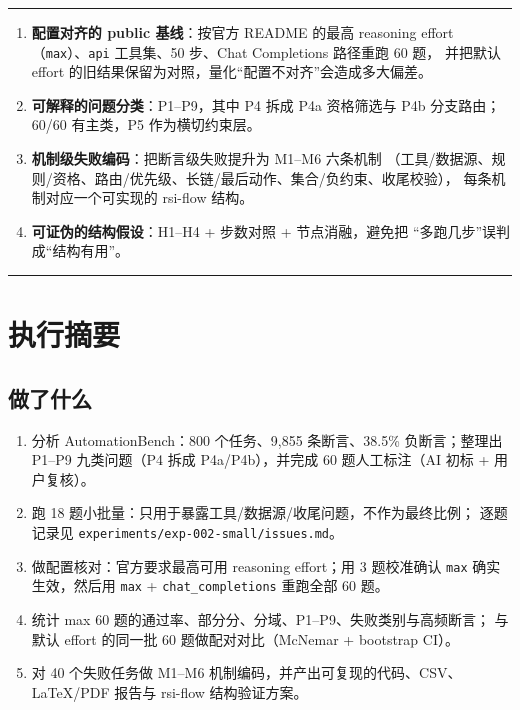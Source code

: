 \documentclass[UTF8,a4paper,11pt]{ctexart}
\begin{document}
\noindent\rule{\textwidth}{0.4pt}
\begin{enumerate}
  \item \textbf{配置对齐的 public 基线}：按官方 README 的最高 reasoning effort
  （\texttt{max}）、\texttt{api} 工具集、50 步、Chat Completions 路径重跑 60 题，
  并把默认 effort 的旧结果保留为对照，量化“配置不对齐”会造成多大偏差。
  \item \textbf{可解释的问题分类}：P1--P9，其中 P4 拆成 P4a 资格筛选与 P4b 分支路由；
  60/60 有主类，P5 作为横切约束层。
  \item \textbf{机制级失败编码}：把断言级失败提升为 M1--M6 六条机制
  （工具/数据源、规则/资格、路由/优先级、长链/最后动作、集合/负约束、收尾校验），
  每条机制对应一个可实现的 rsi-flow 结构。
  \item \textbf{可证伪的结构假设}：H1--H4 + 步数对照 + 节点消融，避免把
  “多跑几步”误判成“结构有用”。
\end{enumerate}
\noindent\rule{\textwidth}{0.4pt}

\tableofcontents
\newpage

\section{执行摘要}

\subsection{做了什么}

\begin{enumerate}
  \item 分析 AutomationBench：800 个任务、9,855 条断言、38.5\% 负断言；整理出 P1--P9
  九类问题（P4 拆成 P4a/P4b），并完成 60 题人工标注（AI 初标 + 用户复核）。
  \item 跑 18 题小批量：只用于暴露工具/数据源/收尾问题，不作为最终比例；
  逐题记录见 \texttt{experiments/\allowbreak exp-002-small/\allowbreak issues.md}。
  \item 做配置核对：官方要求最高可用 reasoning effort；用 3 题校准确认 \texttt{max}
  确实生效，然后用 \texttt{max} + \texttt{chat\_completions} 重跑全部 60 题。
  \item 统计 max 60 题的通过率、部分分、分域、P1--P9、失败类别与高频断言；
  与默认 effort 的同一批 60 题做配对对比（McNemar + bootstrap CI）。
  \item 对 40 个失败任务做 M1--M6 机制编码，并产出可复现的代码、CSV、
  LaTeX/PDF 报告与 rsi-flow 结构验证方案。
\end{enumerate}
\end{document}
